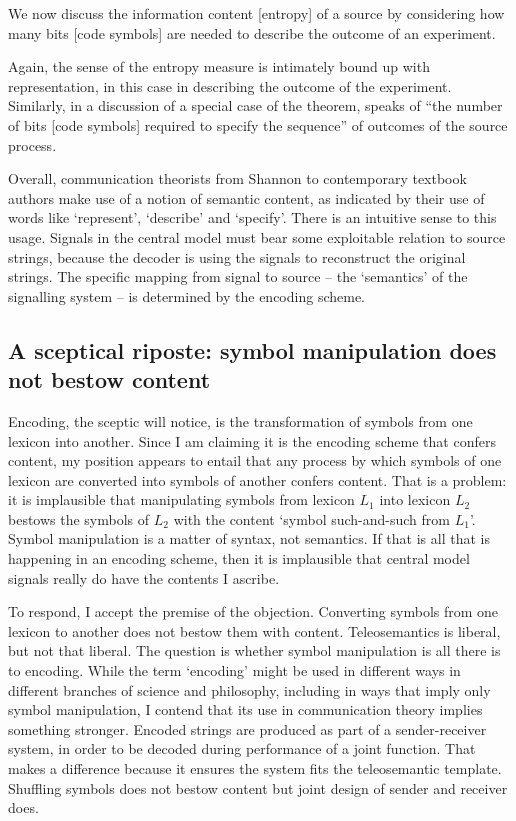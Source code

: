 \documentclass[12pt]{article}
\begin{document}
\begin{myquote}
We now discuss the information content [entropy] of a source by considering how many bits [code symbols] are needed to describe the outcome of an experiment.
\par\hspace*{\fill}\citet[73]{mackay2003information}
\end{myquote}

\noindent Again, the sense of the entropy measure is intimately bound up with representation, in this case in describing the outcome of the experiment.
Similarly, in a discussion of a special case of the theorem, \citet[397]{shannon1948mathematicalc} speaks of ``the number of bits [code symbols] required to specify the sequence'' of outcomes of the source process.

Overall, communication theorists from Shannon to contemporary textbook authors make use of a notion of semantic content, as indicated by their use of words like `represent', `describe' and `specify'.
There is an intuitive sense to this usage.
Signals in the central model must bear some exploitable relation to source strings, because the decoder is using the signals to reconstruct the original strings.
The specific mapping from signal to source -- the `semantics' of the signalling system -- is determined by the encoding scheme.

\subsection{A sceptical riposte: symbol manipulation does not bestow content}

Encoding, the sceptic will notice, is the transformation of symbols from one lexicon into another.
Since I am claiming it is the encoding scheme that confers content, my position appears to entail that any process by which symbols of one lexicon are converted into symbols of another confers content.
That is a problem: it is implausible that manipulating symbols from lexicon $L_1$ into lexicon $L_2$ bestows the symbols of $L_2$ with the content `symbol such-and-such from $L_1$'.
Symbol manipulation is a matter of syntax, not semantics.
If that is all that is happening in an encoding scheme, then it is implausible that central model signals really do have the contents I ascribe.

To respond, I accept the premise of the objection.
Converting symbols from one lexicon to another does not bestow them with content.
Teleosemantics is liberal, but not that liberal.
The question is whether symbol manipulation is all there is to encoding.
While the term `encoding' might be used in different ways in different branches of science and philosophy, including in ways that imply only symbol manipulation, I contend that its use in communication theory implies something stronger.
Encoded strings are produced as part of a sender-receiver system, in order to be decoded during performance of a joint function.
That makes a difference because it ensures the system fits the teleosemantic template.
Shuffling symbols does not bestow content but joint design of sender and receiver does.
\end{document}
